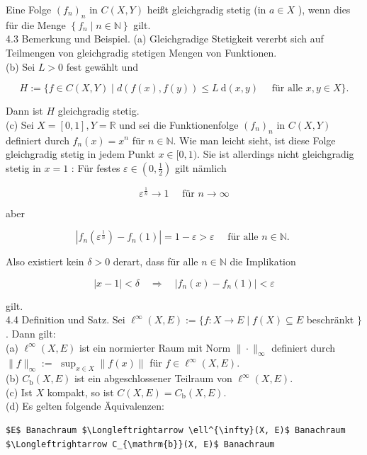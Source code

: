 \documentclass[10pt, letterpaper]{article}
\begin{document}
Eine Folge $\left(f_{n}\right)_{n}$ in $C(X, Y)$ heißt gleichgradig stetig (in $a \in X$ ), wenn dies für die Menge $\left\{f_{n} \mid n \in \mathbb{N}\right\}$ gilt.\\
4.3 Bemerkung und Beispiel. (a) Gleichgradige Stetigkeit vererbt sich auf Teilmengen von gleichgradig stetigen Mengen von Funktionen.\\
(b) Sei $L>0$ fest gewählt und

$$
H:=\{f \in C(X, Y) \mid d(f(x), f(y)) \leq L \mathrm{~d}(x, y) \quad \text { für alle } x, y \in X\} .
$$

Dann ist $H$ gleichgradig stetig.\\
(c) Sei $X=[0,1], Y=\mathbb{R}$ und sei die Funktionenfolge $\left(f_{n}\right)_{n}$ in $C(X, Y)$ definiert durch $f_{n}(x)=x^{n}$ für $n \in \mathbb{N}$. Wie man leicht sieht, ist diese Folge gleichgradig stetig in jedem Punkt $x \in[0,1)$. Sie ist allerdings nicht gleichgradig stetig in $x=1$ : Für festes $\varepsilon \in\left(0, \frac{1}{2}\right)$ gilt nämlich

$$
\varepsilon^{\frac{1}{n}} \rightarrow 1 \quad \text { für } n \rightarrow \infty
$$

aber

$$
\left|f_{n}\left(\varepsilon^{\frac{1}{n}}\right)-f_{n}(1)\right|=1-\varepsilon>\varepsilon \quad \text { für alle } n \in \mathbb{N} \text {. }
$$

Also existiert kein $\delta>0$ derart, dass für alle $n \in \mathbb{N}$ die Implikation

$$
|x-1|<\delta \quad \Longrightarrow \quad\left|f_{n}(x)-f_{n}(1)\right|<\varepsilon
$$

gilt.\\
4.4 Definition und Satz. Sei $\ell^{\infty}(X, E):=\{f: X \rightarrow E \mid f(X) \subseteq E$ beschränkt $\}$. Dann gilt:\\
(a) $\ell^{\infty}(X, E)$ ist ein normierter Raum mit Norm $\|\cdot\|_{\infty}$ definiert durch $\|f\|_{\infty}:=$ $\sup _{x \in X}\|f(x)\|$ für $f \in \ell^{\infty}(X, E)$.\\
(b) $C_{\mathrm{b}}(X, E)$ ist ein abgeschlossener Teilraum von $\ell^{\infty}(X, E)$.\\
(c) Ist $X$ kompakt, so ist $C(X, E)=C_{\mathrm{b}}(X, E)$.\\
(d) Es gelten folgende Äquivalenzen:

\begin{verbatim}
$E$ Banachraum $\Longleftrightarrow \ell^{\infty}(X, E)$ Banachraum $\Longleftrightarrow C_{\mathrm{b}}(X, E)$ Banachraum
\end{verbatim}
\end{document}
